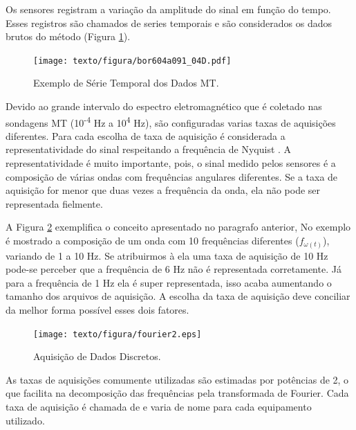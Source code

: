         Os sensores registram a variação da amplitude do sinal em função do tempo. Esses registros são chamados de series temporais e são considerados os dados brutos do método (Figura \ref{serie-temporal}).
        
        \begin{figure}[H]
            \caption{Exemplo de Série Temporal dos Dados MT.}
                \begin{center}
                    \texttt{[image: texto/figura/bor604a091\_04D.pdf]}
                \end{center}
            \label{serie-temporal}
        \end{figure}
        
        Devido ao grande intervalo do espectro eletromagnético que é coletado nas sondagens MT (10\textsuperscript{-4} Hz a 10\textsuperscript{4} Hz), são configuradas varias taxas de aquisições diferentes. Para cada escolha de taxa de aquisição é considerada a representatividade do sinal respeitando a frequência de Nyquist \cite{nyquist28}. A representatividade é muito importante, pois, o sinal medido pelos sensores é a composição de várias ondas com frequências angulares diferentes. Se a taxa de aquisição for menor que duas vezes a frequência da onda, ela não pode ser representada fielmente.  
        
        A Figura \ref{fig-aquisicao} exemplifica o conceito apresentado no paragrafo anterior, No exemplo é mostrado a composição de um onda com 10 frequências diferentes ($f_{\omega(t)}$), variando de 1 a 10 Hz. Se atribuirmos à ela uma taxa de aquisição de 10 Hz pode-se perceber que a frequência de 6 Hz não é representada corretamente. Já para a frequência de 1 Hz ela é super representada, isso acaba aumentando o tamanho dos arquivos de aquisição. A escolha da taxa de aquisição deve conciliar da melhor forma possível esses dois fatores.
        
        \begin{figure}[H]
            \caption{Aquisição de Dados Discretos.}
                \begin{center}
                    \texttt{[image: texto/figura/fourier2.eps]}
                \end{center}
            \label{fig-aquisicao}
        \end{figure}
    
        As taxas de aquisições comumente utilizadas são estimadas por potências de 2, o que facilita na decomposição das frequências pela transformada de Fourier. Cada taxa de aquisição é chamada de  e varia de nome para cada equipamento utilizado. 
    
